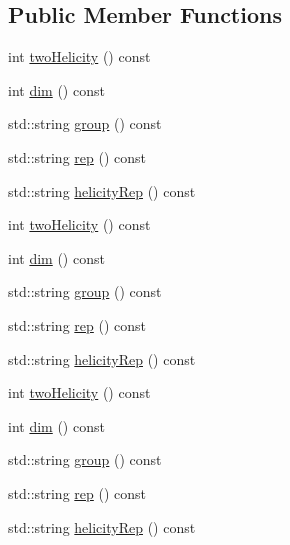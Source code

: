 \subsection*{Public Member Functions}
\begin{DoxyCompactItemize}
\item 
int \mbox{\hyperlink{structHadron_1_1H3o2C4nnmERep_a35fd1930d21f1fdc0c007b9d9f95b211}{two\+Helicity}} () const
\item 
int \mbox{\hyperlink{structHadron_1_1H3o2C4nnmERep_a8033496b62e24970283fce0c10203e0c}{dim}} () const
\item 
std\+::string \mbox{\hyperlink{structHadron_1_1H3o2C4nnmERep_a94fc651e597e1a65fb7be16b3b6e8ef9}{group}} () const
\item 
std\+::string \mbox{\hyperlink{structHadron_1_1H3o2C4nnmERep_af384ff99c3d56a172c61764888b2999b}{rep}} () const
\item 
std\+::string \mbox{\hyperlink{structHadron_1_1H3o2C4nnmERep_a4ca04daa91fc608d0c528d0e0eb6a24e}{helicity\+Rep}} () const
\item 
int \mbox{\hyperlink{structHadron_1_1H3o2C4nnmERep_a35fd1930d21f1fdc0c007b9d9f95b211}{two\+Helicity}} () const
\item 
int \mbox{\hyperlink{structHadron_1_1H3o2C4nnmERep_a8033496b62e24970283fce0c10203e0c}{dim}} () const
\item 
std\+::string \mbox{\hyperlink{structHadron_1_1H3o2C4nnmERep_a94fc651e597e1a65fb7be16b3b6e8ef9}{group}} () const
\item 
std\+::string \mbox{\hyperlink{structHadron_1_1H3o2C4nnmERep_af384ff99c3d56a172c61764888b2999b}{rep}} () const
\item 
std\+::string \mbox{\hyperlink{structHadron_1_1H3o2C4nnmERep_a4ca04daa91fc608d0c528d0e0eb6a24e}{helicity\+Rep}} () const
\item 
int \mbox{\hyperlink{structHadron_1_1H3o2C4nnmERep_a35fd1930d21f1fdc0c007b9d9f95b211}{two\+Helicity}} () const
\item 
int \mbox{\hyperlink{structHadron_1_1H3o2C4nnmERep_a8033496b62e24970283fce0c10203e0c}{dim}} () const
\item 
std\+::string \mbox{\hyperlink{structHadron_1_1H3o2C4nnmERep_a94fc651e597e1a65fb7be16b3b6e8ef9}{group}} () const
\item 
std\+::string \mbox{\hyperlink{structHadron_1_1H3o2C4nnmERep_af384ff99c3d56a172c61764888b2999b}{rep}} () const
\item 
std\+::string \mbox{\hyperlink{structHadron_1_1H3o2C4nnmERep_a4ca04daa91fc608d0c528d0e0eb6a24e}{helicity\+Rep}} () const
\end{DoxyCompactItemize}


